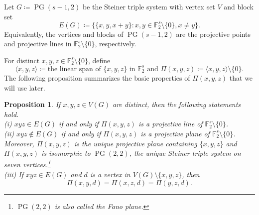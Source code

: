 \documentclass[10pt,a4paper]{article}
\newtheorem{proposition}[theorem]{Proposition}
\theoremstyle{definition}
\newcommand{\FF}{\mathbb{F}}
\DeclareMathOperator{\PG}{PG}
\begin{document}
Let $G\coloneqq \PG(s-1,2)$ be the Steiner triple system with vertex set $V$ and block set
\[
    E(G)\coloneqq \bigl\{\{x,y,x+y\}\colon x,y\in\FF_2^s\setminus\{0\},x\ne y\bigr\}.
\]
Equivalently, the vertices and blocks of $\PG(s-1,2)$ are the projective points and projective lines in $\FF_2^s\setminus\{0\}$, respectively.


\medskip
For distinct $x,y,z\in \FF_2^s\setminus\{0\}$, define
\begin{equation}\label{eq:def of cl}
    \langle x,y,z\rangle \coloneqq \text{the linear span of } \{x,y,z\} \text{ in }\FF_2^s
    \text{ and }
    \Pi(x,y,z) \coloneqq \langle x,y,z\rangle\setminus\{0\}.
\end{equation}
The following proposition summarizes the basic properties of $\Pi(x,y,z)$ that we will use later.
\begin{proposition}\label{prop:property of cl}
    If $x,y,z\in V(G)$ are distinct, then the following statements hold. \\
    \noindent (i) $xyz\in E(G)$ if and only if $\Pi(x,y,z)$ is a projective line of $\FF_2^s\setminus\{0\}$. \\
    \noindent (ii) $xyz\notin E(G)$ if and only if $\Pi(x,y,z)$ is a projective plane of $\FF_2^s\setminus\{0\}$.
    Moreover, $\Pi(x,y,z)$ is the unique projective plane containing $\{x,y,z\}$ and $\Pi(x,y,z)$ is isomorphic to $\PG(2,2)$, the unique Steiner triple system on seven vertices.\footnote{$\PG(2,2)$ is also called the {\it Fano plane}.} \\
    \noindent (iii) If $xyz\in E(G)$ and $d$ is a vertex in $V(G)\setminus\{x,y,z\}$, then
    \[
        \Pi(x,y,d)=\Pi(x,z,d)=\Pi(y,z,d).
    \]
\end{proposition}
\end{document}
